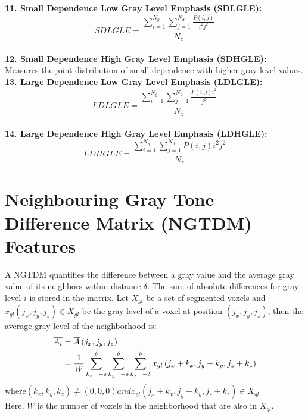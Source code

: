 \textbf{11. Small Dependence Low Gray Level Emphasis (SDLGLE):}\\
\[\textit{SDLGLE}=\frac{\sum _{i=1}^{N_{g}}\sum _{j=1}^{N_{d}}\frac{P\left(i,j\right)}{i^{2}j^{2}}}{N_{z}}\]\\
\textbf{12. Small Dependence High Gray Level Emphasis (SDHGLE):}\\
Measures the joint distribution of small dependence with higher gray-level values.\\
\textbf{13. Large Dependence Low Gray Level Emphasis (LDLGLE):}\\
\[\textit{LDLGLE}=\frac{\sum _{i=1}^{N_{g}}\sum _{j=1}^{N_{d}}\frac{P\left(i,j\right)i^{2}}{j^{2}}}{N_{z}}\]\\
\textbf{14. Large Dependence High Gray Level Emphasis (LDHGLE):}\\
\[\textit{LDHGLE}=\frac{\sum _{i=1}^{N_{g}}\sum _{j=1}^{N_{d}}P\left(i,j\right)i^{2}j^{2}}{N_{z}}\]


\section{Neighbouring Gray Tone Difference Matrix (NGTDM) Features}


A NGTDM quantifies the difference between a gray value and the average gray value of its neighbors within distance $\delta $. The sum of absolute differences for gray level $i$ is stored in the matrix. Let $X_{gl}$ be a set of segmented voxels and $x_{gl}\left(j_{x},j_{y},j_{z}\right)\in X_{gl}$ be the gray level of a voxel at position $\left(j_{x},j_{y},j_{z}\right)$, then the average gray level of the neighborhood is:\\
\begin{align}
\overline{A_{i}} & =\overline{A}\left(j_{x},j_{y},j_{z}\right) \\
& = \frac{1}{W}\sum _{k_{x}=-\delta }^{\delta }\sum _{k_{y}=-\delta }^{\delta }\sum _{k_{z}=-\delta}^{\delta}x_{gl}\left(j_{x}+k_{x},j_{y}+k_{y},j_{z}+k_{z}\right) \\
\end{align}
$\text{where} \left(k_{x},k_{y},k_{z}\right)\neq \left(0,0,0\right) and x_{gl}\left(j_{x}+k_{x},j_{y}+k_{y},j_{z}+k_{z}\right)\in X_{gl}$\\
Here, $W$ is the number of voxels in the neighborhood that are also in $X_{gl}$.\\

